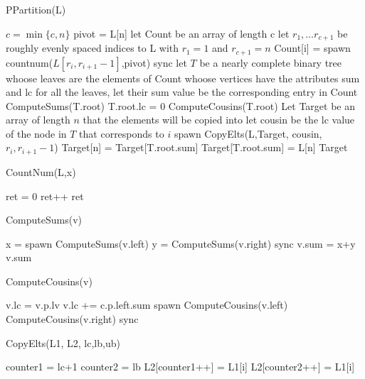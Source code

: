 \documentclass{article}
\begin{document}
\begin{algorithm}
\caption{PPartition(L)}
\begin{algorithmic}
\State $c= \min\{c,n\}$
\State pivot = L[n]
\State let Count be an array of length c
\State let $r_1, \ldots r_{c+1}$ be roughly evenly spaced indices to L with $r_1 = 1$ and $r_{c+1} = n$
\State Count[i] = spawn countnum($L[r_i,r_{i+1}-1]$,pivot)
\EndFor
\State sync
\State let $T$ be a nearly complete binary tree whoose leaves are the elements of Count whoose vertices have the attributes sum and lc
\State for all the leaves, let their sum value be the corresponding entry in Count
\State ComputeSums(T.root)
\State T.root.lc = 0
\State ComputeCousins(T.root)
\State Let Target be an array of length $n$ that the elements will be copied into
\State let cousin be the lc value of the node in $T$ that corresponds to $i$
\State spawn CopyElts(L,Target, cousin,$r_i,r_{i+1}-1$)
\EndFor
\State Target[n] = Target[T.root.sum]
\State Target[T.root.sum]  = L[n]
\State \Return Target
\end{algorithmic}
\end{algorithm}
\begin{algorithm}
\caption{CountNum(L,x)}
\begin{algorithmic}
\State ret = 0
\State ret++
\EndIf
\EndFor
\State \Return ret
\end{algorithmic}
\end{algorithm}
\begin{algorithm}
\caption{ComputeSums(v)}
\begin{algorithmic}
\State x = spawn ComputeSums(v.left)
\State y = ComputeSums(v.right)
\State sync
\State v.sum = x+y
\EndIf
\State \Return v.sum
\end{algorithmic}
\end{algorithm}
\begin{algorithm}
\caption{ComputeCousins(v)}
\begin{algorithmic}
\State v.lc = v.p.lv
\State v.lc += c.p.left.sum
\EndIf
\State spawn ComputeCousins(v.left)
\State ComputeCousins(v.right)
\State sync
\EndIf
\end{algorithmic}
\end{algorithm}
\begin{algorithm}
\caption{CopyElts(L1, L2, lc,lb,ub)}
\begin{algorithmic}
\State counter1 = lc+1
\State counter2 = lb
\State L2[counter1++] = L1[i]
\Else
\State L2[counter2++] = L1[i]
\EndIf
\EndFor
\end{algorithmic}
\end{algorithm}
\end{document}
